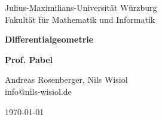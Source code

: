 \begin{titlepage}
  Julius-Maximilians-Universität Würzburg\\
  Fakultät für Mathematik und Informatik
  
  \vspace{3cm}
  
  \begin{center}
   \LARGE\textbf{Differentialgeometrie}
  \end{center}
  
  \vspace{0cm}
  
  \begin{center}
   \huge\textbf{Prof. Pabel}
  \end{center}
  
  \vspace{1cm}
  
  \begin{center}
   \Large Andreas Rosenberger, Nils Wisiol \\
   \footnotesize info@nils-wisiol.de
  \end{center}
  
  \vspace{0cm}
  
  \begin{center}
   \Large \today
  \end{center}
  
  
\end{titlepage}
